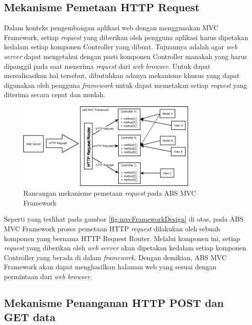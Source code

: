 \subsection{Mekanisme Pemetaan HTTP Request}

Dalam konteks pengembangan aplikasi web dengan menggunakan MVC Framework, setiap \textit{request} yang diberikan oleh pengguna aplikasi harus dipetakan kedalam setiap komponen Controller yang dibuat. Tujuannya adalah agar \textit{web server} dapat mengetahui dengan pasti komponen Controller manakah yang harus dipanggil pada saat menerima \textit{request} dari \textit{web browser}. Untuk dapat merealisasikan hal tersebut, dibutuhkan adanya mekanisme khusus yang dapat digunakan oleh pengguna \textit{framework} untuk dapat memetakan setiap \textit{request} yang diterima secara cepat dan mudah.

\begin{figure}
    \centering
    \includegraphics[width=0.8\textwidth]{img/mvc-routing-mechanism}
    \caption{Rancangan mekanisme pemetaan \textit{request} pada ABS MVC Framework}
    \label{fig:mvcRoutingMechanism}
\end{figure}

Seperti yang terlihat pada gambar \ref{fig:mvcFrameworkDesign} di atas, pada ABS MVC Framework proses pemetaan HTTP \textit{request} dilakukan oleh sebuah komponen yang bernama HTTP Request Router. Melalui komponen ini, setiap \textit{request} yang diberikan oleh \textit{web server} akan dipetakan kedalam setiap komponen Controller yang berada di dalam \textit{framework}. Dengan demikian, ABS MVC Framework akan dapat menghasilkan halaman web yang sesuai dengan permintaan dari \textit{web browser}.

\subsection{Mekanisme Penanganan HTTP POST dan GET data}

